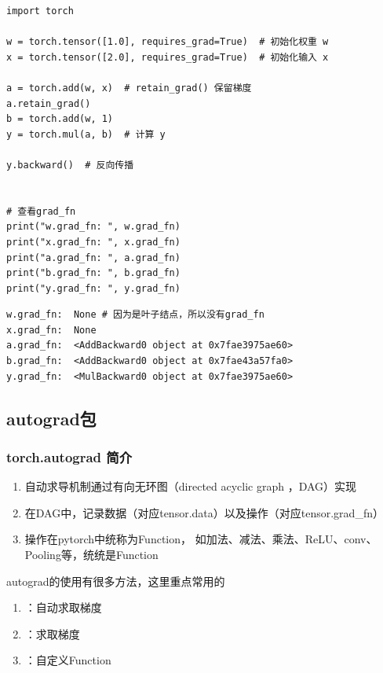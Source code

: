 \begin{lstlisting}[style=pythonstyle]
import torch

w = torch.tensor([1.0], requires_grad=True)  # 初始化权重 w
x = torch.tensor([2.0], requires_grad=True)  # 初始化输入 x

a = torch.add(w, x)  # retain_grad() 保留梯度
a.retain_grad()
b = torch.add(w, 1)
y = torch.mul(a, b)  # 计算 y

y.backward()  # 反向传播


# 查看grad_fn
print("w.grad_fn: ", w.grad_fn)
print("x.grad_fn: ", x.grad_fn)
print("a.grad_fn: ", a.grad_fn)
print("b.grad_fn: ", b.grad_fn)
print("y.grad_fn: ", y.grad_fn)
\end{lstlisting}
\begin{lstlisting}[style=demostyle,numbers=none]
w.grad_fn:  None # 因为是叶子结点，所以没有grad_fn
x.grad_fn:  None
a.grad_fn:  <AddBackward0 object at 0x7fae3975ae60>
b.grad_fn:  <AddBackward0 object at 0x7fae43a57fa0>
y.grad_fn:  <MulBackward0 object at 0x7fae3975ae60>
\end{lstlisting}        

\subsection{autograd包}
\label{subsec:Pytorch的autograd包}
\subsubsection{torch.autograd 简介}
\begin{enumerate}[label=\arabic*)]
        \item 自动求导机制通过有向无环图（directed acyclic graph ，DAG）实现
        \item 在DAG中，记录数据（对应tensor.data）以及操作（对应tensor.grad\_fn）
        \item 操作在pytorch中统称为Function，
        如加法、减法、乘法、ReLU、conv、Pooling等，统统是Function  
\end{enumerate}

autograd的使用有很多方法，这里重点常用的
\begin{enumerate}[label=\arabic*)]
        \item {}：自动求取梯度
        \item {}：求取梯度
        \item {}：自定义Function
\end{enumerate}


